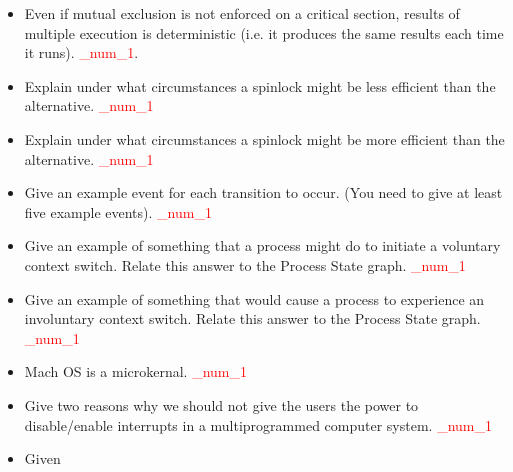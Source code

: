 \documentclass[9pt,landscape]{memoir}
\newcommand{\answer}[1]{\textcolor{red}{_num_1}}
\begin{document}
\begin{multicols}{6}
\begin{itemize}
    \item Even if mutual exclusion is not enforced on a critical section, results of multiple execution is deterministic (i.e. it produces the same results each time it runs). \answer{False.}.
    \item Explain under what circumstances a spinlock might be less efficient than the alternative.  \answer{In uniprocessor systems, processes can use CPU one at a time.  If a process is "busy waiting" for a long time, then a spinlock might be less efficient.}
    \item Explain under what circumstances a spinlock might be more efficient than the alternative.  \answer{1. If you have more processor power than you need (e.g. in multiprocessor systems). Spinlock do not require context switch when a process must wait on a lock, and therefore it is more efficient.  2. when the locks are expected to be held for a short time, a spinlock might be more efficient (saves the context switch time, therefore, preferred).}
    \item Give an example event for each transition to occur. (You need to give at least five example events). \answer{\{create process\}: user starts a new process or a program issues a \texttt{fork()} or a \texttt{pthread\_create()} call. \{cpu available\}: the process currently occupying CPU stops running and the process in front of the READY queue is scheduled to run \{time expires\}: currently running process uses up its alloted time slot for this turn (timer interrupt). \{event wait\}: the process issues an I/O read \{event completed\}: DMA controller interrupts CPU signalling the completion of an I/O read \{exit system\}: process terminates or segmentation fault.}
    \item Give an example of something that a process might do to initiate a voluntary context switch.  Relate this answer to the Process State graph. \answer{When a process initiates an I/O Read/Write or event \texttt{wait()}. In the Process State graph, the transition is from Running State to \texttt{BLOCKED(Waiting)} State.}
    \item Give an example of something that would cause a process to experience an involuntary context switch.  Relate this answer to the Process State graph.  \answer{When a process is interrupted by an exernal source such as a timer.  In the Process State graph, the transition is from Running to Ready State.}
    \item Mach OS is a microkernal. \answer{True.}
    \item Give two reasons why we should not give the users the power to disable/enable interrupts in a multiprogrammed computer system.  \answer{(i) they may (unintentionally) forget to enable them which means all (hardware \& software) interrupts will be ignored.  (ii) they may intentionally abuse this power and let their processes dominate the system resources.}
    \item Given
\end{itemize}


\end{multicols}
\end{document}
